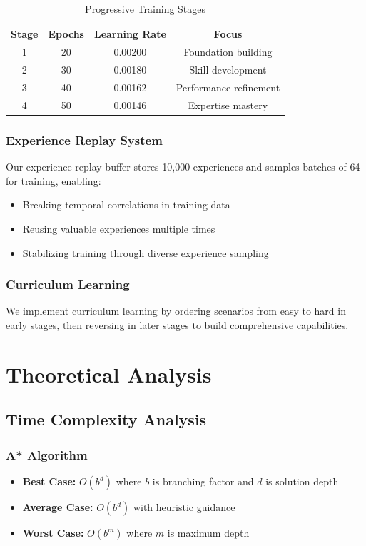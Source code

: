 \documentclass[12pt, a4paper]{report}
\begin{document}
\begin{table}[H]
\centering
\caption{Progressive Training Stages}
\begin{tabular}{|c|c|c|c|}
\hline
\textbf{Stage} & \textbf{Epochs} & \textbf{Learning Rate} & \textbf{Focus} \\
\hline
1 & 20 & 0.00200 & Foundation building \\
2 & 30 & 0.00180 & Skill development \\
3 & 40 & 0.00162 & Performance refinement \\
4 & 50 & 0.00146 & Expertise mastery \\
\hline
\end{tabular}
\end{table}

\subsection{Experience Replay System}
Our experience replay buffer stores 10,000 experiences and samples batches of 64 for training, enabling:
\begin{itemize}
    \item Breaking temporal correlations in training data
    \item Reusing valuable experiences multiple times
    \item Stabilizing training through diverse experience sampling
\end{itemize}

\subsection{Curriculum Learning}
We implement curriculum learning by ordering scenarios from easy to hard in early stages, then reversing in later stages to build comprehensive capabilities.

\chapter{Theoretical Analysis}

\section{Time Complexity Analysis}

\subsection{A* Algorithm}
\begin{itemize}
    \item \textbf{Best Case:} $O(b^d)$ where $b$ is branching factor and $d$ is solution depth
    \item \textbf{Average Case:} $O(b^d)$ with heuristic guidance
    \item \textbf{Worst Case:} $O(b^m)$ where $m$ is maximum depth
\end{itemize}
\end{document}
